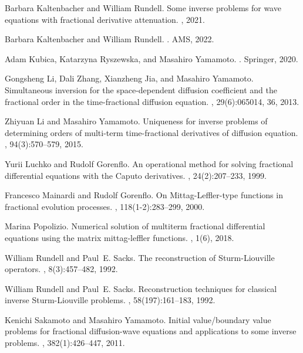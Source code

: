 \documentclass[12pt]{article}
\begin{document}
\begin{thebibliography}{10}
Barbara Kaltenbacher and William Rundell.
\newblock Some inverse problems for wave equations with fractional derivative
  attenuation.
, 2021.

Barbara Kaltenbacher and William Rundell.
.
\newblock AMS, 2022.

Adam Kubica, Katarzyna Ryszewska, and Masahiro Yamamoto.
.
\newblock Springer, 2020.

Gongsheng Li, Dali Zhang, Xianzheng Jia, and Masahiro Yamamoto.
\newblock Simultaneous inversion for the space-dependent diffusion coefficient
  and the fractional order in the time-fractional diffusion equation.
, 29(6):065014, 36, 2013.

Zhiyuan Li and Masahiro Yamamoto.
\newblock Uniqueness for inverse problems of determining orders of multi-term
  time-fractional derivatives of diffusion equation.
, 94(3):570--579, 2015.

Yurii Luchko and Rudolf Gorenflo.
\newblock An operational method for solving fractional differential equations
  with the {C}aputo derivatives.
, 24(2):207--233, 1999.

Francesco Mainardi and Rudolf Gorenflo.
\newblock On {M}ittag-{L}effler-type functions in fractional evolution
  processes.
, 118(1-2):283--299, 2000.

Marina Popolizio.
\newblock Numerical solution of multiterm fractional differential equations
  using the matrix mittag-leffler functions.
, 1(6), 2018.

William Rundell and Paul~E. Sacks.
\newblock The reconstruction of {S}turm-{L}iouville operators.
, 8(3):457--482, 1992.

William Rundell and Paul~E. Sacks.
\newblock Reconstruction techniques for classical inverse {S}turm-{L}iouville
  problems.
, 58(197):161--183, 1992.

Kenichi Sakamoto and Masahiro Yamamoto.
\newblock Initial value/boundary value problems for fractional diffusion-wave
  equations and applications to some inverse problems.
, 382(1):426--447, 2011.


\end{thebibliography}
\end{document}
